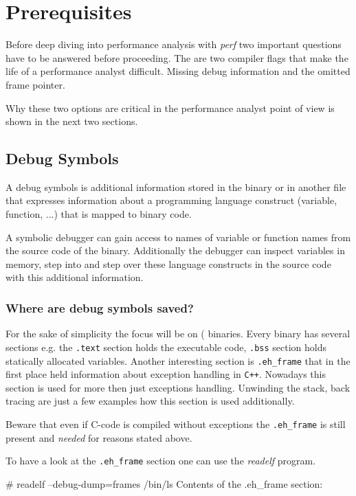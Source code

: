 \section{Prerequisites}
Before deep diving into performance analysis with {\em perf} two important
questions have to be answered before proceeding. The are two compiler
flags that make the life of a performance analyst difficult. Missing
debug information and the omitted frame pointer.

Why these two options are critical in the performance analyst point of
view is shown in the next two sections.

\subsection[ssec:dsymbol]{Debug Symbols}

A debug symbols is additional information stored in the binary or in
another file that expresses information about a programming language
construct (variable, function, ...) that is mapped to binary code.

A symbolic debugger can gain access to names of variable or function
names from the source code of the binary. Additionally the debugger
can inspect variables in memory, step into and step over these
language constructs in the source code with this additional
information.

\subsubsection{Where are debug symbols saved?}

For the sake of simplicity the focus will be on  (\ELF\)
binaries. Every binary has several sections e.g. the {\tt .text} section
holds the executable code, {\tt .bss} section holds statically
allocated variables. Another interesting section is {\tt .eh_frame}
that in the first place held information about exception handling in
{\tt C++}.  Nowadays this section is used for more then just
exceptions handling. Unwinding the stack, back tracing are just a few
examples how this section is used additionally.

Beware that even if C-code is compiled without exceptions the
{\tt .eh_frame} is still present and {\em needed} for reasons stated above.

To have a look at the {\tt .eh_frame} section one can use the {\em readelf}
program.

\starttyping
# readelf --debug-dump=frames /bin/ls
Contents of the .eh_frame section:

